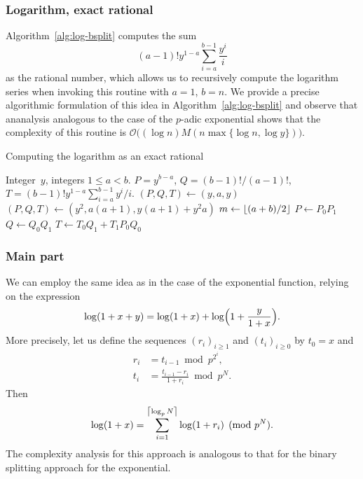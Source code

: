 \subsubsection{Logarithm, exact rational}

Algorithm~\ref{alg:log-bsplit} computes the sum 
\begin{equation}
(a-1)! y^{1-a} \sum_{i=a}^{b-1} \frac{y^i}{i}
\end{equation}
as the rational number, which allows us to recursively compute the 
logarithm series when invoking this routine with $a = 1$, $b = n$.  
We provide a precise algorithmic formulation of this idea in 
Algorithm~\ref{alg:log-bsplit} and observe that ananalysis analogous 
to the case of the $p$-adic exponential shows that the complexity 
of this routine is 
$\mathcal{O}\bigl( (\log n) M(n\max\{\log n, \log y\}) \bigr)$.

\begin{algorithm}
\caption{Computing the  logarithm as an exact rational}
\label{alg:log-bsplit}
\begin{algorithmic}
\vspace{1mm}
\Require Integer~$y$, integers $1 \leq a < b$.
\Ensure  $P = y^{b-a}$, $Q = (b-1)! / (a-1)!$, $T = (b-1)! y^{1-a} \sum_{i=a}^{b-1} y^i / i$.
\State $(P, Q, T) \gets (y, a, y)$
\State $(P, Q, T) \gets (y^2, a (a + 1), y (a + 1) + y^2 a)$
\Else
\State $m \gets \left\lfloor(a + b) / 2\right\rfloor$
\State {}
\State {}
\State $P \gets P_0 P_1$
\State $Q \gets Q_0 Q_1$
\State $T \gets T_0 Q_1 + T_1 P_0 Q_0$
\EndIf
\EndProcedure
\end{algorithmic}
\end{algorithm}

\subsubsection{Main part}

We can employ the same idea as in the case of the exponential 
function, relying on the expression 
\begin{equation}
\log(1 + x + y) = \log(1 + x) + \log \Bigl(1 + \frac{y}{1+x}\Bigr).
\end{equation}
More precisely, let us define the sequences $(r_i)_{i \geq 1}$ and 
$(t_i)_{i \geq 0}$ by $t_0 = x$ and 
\begin{align}
r_i & = t_{i-1} \bmod{p^{2^i}}, \\
t_i & = \frac{t_{i-1} - r_i}{1 + r_i} \bmod{p^N}.
\end{align}
Then 
\begin{equation}
\log(1 + x) = \sum_{i=1}^{\left\lceil\log_p N\right\rceil} \log(1 + r_i) \pmod{p^N}.
\end{equation}
The complexity analysis for this approach is analogous to that for 
the binary splitting approach for the exponential.

